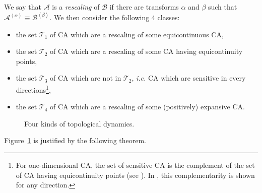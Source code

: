 \documentclass[a4paper]{elsarticle}
\newcommand{\ACA}{\mathcal{A}}
\newcommand{\ACB}{\mathcal{B}}
\newcommand\bulk[2]{{#1}^{\left\langle{#2}\right\rangle}}
\newcommand{\isom}{\equiv}
\newcommand\zee[1]{\mathcal{Z}_{#1}}
\newcommand\equi{\mathcal{T}_1}
\newcommand\equipt{\mathcal{T}_2}
\newcommand\sensi{\mathcal{T}_3}
\newcommand\expansi{\mathcal{T}_4}
\begin{document}
We say that $\ACA$ is a \emph{rescaling} of $\ACB$ if there are
transforms $\alpha$ and $\beta$ such that
${\bulk{\ACA}{\alpha}\isom\bulk{\ACB}{\beta}}$.  We then consider the
following $4$ classes:

\begin{itemize}
\item the set $\equi$ of CA which are a rescaling of some equicontinuous CA,
\item the set $\equipt$ of CA which are a rescaling of some CA having
  equicontinuity points,
\item the set $\sensi$ of CA which are not in $\equipt$, \textit{i.e.}
  CA which are sensitive in every directions\footnote{For
    one-dimensional CA, the set of sensitive CA is the complement of
    the set of CA having equicontinuity points (see \cite{Kurka97}). In
    \cite{sablikTCS}, this complementarity is shown for any
    direction.},
\item the set $\expansi$ of CA which are a rescaling of some
  (positively) expansive CA.
\end{itemize}

\begin{figure}[htbp]
  \centering
  \caption{Four kinds of topological dynamics.}
  \label{fig:shiftkurka}
\end{figure}

Figure~\ref{fig:shiftkurka} is justified by the following theorem.
\end{document}
